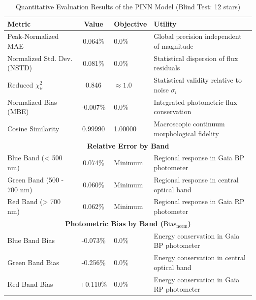
\begin{table}[htpb]
\centering
\caption{Quantitative Evaluation Results of the PINN Model (Blind Test: 12 stars)}
\label{tab:pinn_evaluation}
\begin{tabular}{lcll}
\hline
\textbf{Metric} & \textbf{Value} & \textbf{Objective} & \textbf{Utility} \\
\hline
Peak-Normalized MAE & 0.064\% & 0.0\% & Global precision independent of magnitude \\
Normalized Std. Dev. (NSTD) & 0.081\% & 0.0\% & Statistical dispersion of flux residuals \\
Reduced $\chi^2_\nu$ & 0.846 & $\approx 1.0$ & Statistical validity relative to noise $\sigma_i$ \\
Normalized Bias (MBE) & -0.007\% & 0.0\% & Integrated photometric flux conservation \\
Cosine Similarity & 0.99990 & 1.00000 & Macroscopic continuum morphological fidelity \\
\hline
\multicolumn{4}{c}{\textbf{Relative Error by Band}} \\
\hline
Blue Band (< 500 nm) & 0.074\% & Minimum & Regional response in Gaia BP photometer \\
Green Band (500 - 700 nm) & 0.060\% & Minimum & Regional response in central optical band \\
Red Band (> 700 nm) & 0.062\% & Minimum & Regional response in Gaia RP photometer \\
\hline
\multicolumn{4}{c}{\textbf{Photometric Bias by Band ($\text{Bias}_{\text{norm}}$)}} \\
\hline
Blue Band Bias & -0.073\% & 0.0\% & Energy conservation in Gaia BP photometer \\
Green Band Bias & -0.256\% & 0.0\% & Energy conservation in central optical band \\
Red Band Bias & +0.110\% & 0.0\% & Energy conservation in Gaia RP photometer \\
\hline
\end{tabular}
\end{table}
